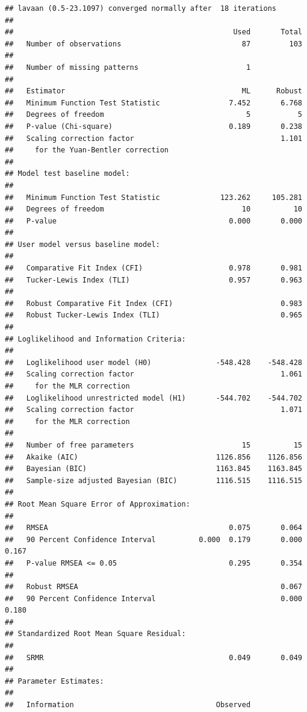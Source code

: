 \documentclass[]{article}
\begin{document}
\begin{verbatim}
## lavaan (0.5-23.1097) converged normally after  18 iterations
## 
##                                                   Used       Total
##   Number of observations                            87         103
## 
##   Number of missing patterns                         1
## 
##   Estimator                                         ML      Robust
##   Minimum Function Test Statistic                7.452       6.768
##   Degrees of freedom                                 5           5
##   P-value (Chi-square)                           0.189       0.238
##   Scaling correction factor                                  1.101
##     for the Yuan-Bentler correction
## 
## Model test baseline model:
## 
##   Minimum Function Test Statistic              123.262     105.281
##   Degrees of freedom                                10          10
##   P-value                                        0.000       0.000
## 
## User model versus baseline model:
## 
##   Comparative Fit Index (CFI)                    0.978       0.981
##   Tucker-Lewis Index (TLI)                       0.957       0.963
## 
##   Robust Comparative Fit Index (CFI)                         0.983
##   Robust Tucker-Lewis Index (TLI)                            0.965
## 
## Loglikelihood and Information Criteria:
## 
##   Loglikelihood user model (H0)               -548.428    -548.428
##   Scaling correction factor                                  1.061
##     for the MLR correction
##   Loglikelihood unrestricted model (H1)       -544.702    -544.702
##   Scaling correction factor                                  1.071
##     for the MLR correction
## 
##   Number of free parameters                         15          15
##   Akaike (AIC)                                1126.856    1126.856
##   Bayesian (BIC)                              1163.845    1163.845
##   Sample-size adjusted Bayesian (BIC)         1116.515    1116.515
## 
## Root Mean Square Error of Approximation:
## 
##   RMSEA                                          0.075       0.064
##   90 Percent Confidence Interval          0.000  0.179       0.000  0.167
##   P-value RMSEA <= 0.05                          0.295       0.354
## 
##   Robust RMSEA                                               0.067
##   90 Percent Confidence Interval                             0.000  0.180
## 
## Standardized Root Mean Square Residual:
## 
##   SRMR                                           0.049       0.049
## 
## Parameter Estimates:
## 
##   Information                                 Observed

\end{verbatim}
\end{document}
